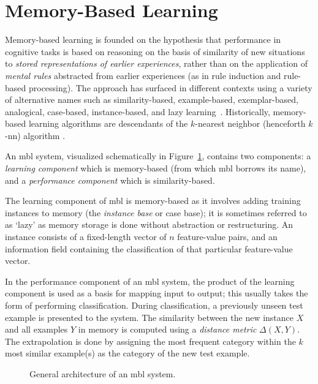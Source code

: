 \documentclass{report}
\begin{document}
\section{Memory-Based Learning}
\label{mbl}

Memory-based learning is founded on the hypothesis that performance in
cognitive tasks is based on reasoning on the basis of similarity of
new situations to {\em stored representations of earlier experiences},
rather than on the application of {\em mental rules}\/ abstracted from
earlier experiences (as in rule induction and rule-based processing).
The approach has surfaced in different contexts using a variety of
alternative names such as similarity-based, example-based,
exemplar-based, analogical, case-based, in\-stance-based, and lazy
learning~\cite{Stanfill+86,Cost+93,Kolodner93,Aha+91,Aha97a}.
Historically, memory-based learning algorithms are descendants of the
$k$-nearest neighbor (henceforth $k$-{\sc nn}) algorithm
\cite{Cover+67,Devijver+82,Aha+91}.

An {\sc mbl} system, visualized schematically in
Figure~\ref{mbl-method}, contains two components: a {\em learning
component}\/ which is memory-based (from which {\sc mbl} borrows its
name), and a {\em performance component}\/ which is similarity-based.

The learning component of {\sc mbl} is memory-based as it involves
adding training instances to memory (the {\em instance base} or case
base); it is sometimes referred to as `lazy' as memory storage is done
without abstraction or restructuring.  An instance consists of a
fixed-length vector of $n$ feature-value pairs, and an information
field containing the classification of that particular feature-value
vector.  

In the performance component of an {\sc mbl} system, the product of
the learning component is used as a basis for mapping input to output;
this usually takes the form of performing classification.  During
classification, a previously unseen test example is presented to the
system. The similarity between the new instance $X$ and all examples
$Y$ in memory is computed using a {\em distance metric}
$\Delta(X,Y)$. The extrapolation is done by assigning the most
frequent category within the $k$ most similar example(s) as the
category of the new test example.

\begin{figure}[htb]
        \begin{center}
                \leavevmode
                \epsfxsize=8cm
                \caption{General architecture of an {\sc mbl} system.
                }
                \label{mbl-method}
        \end{center}
\end{figure}
\end{document}
